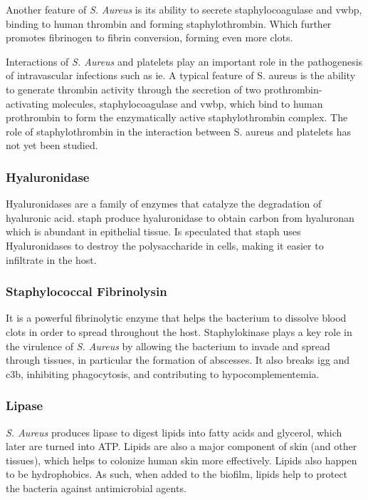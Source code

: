 Another feature of \textit{S. Aureus} is its ability to secrete staphylocoagulase and \gls{vwbp}, binding to human thrombin and forming staphylothrombin. Which further promotes fibrinogen to fibrin conversion, forming even more clots.

Interactions of \textit{S. Aureus} and platelets play an important role in the pathogenesis of intravascular infections such as \gls{ie}. A typical feature of S. aureus is the ability to generate thrombin activity through the secretion of two prothrombin-activating molecules, staphylocoagulase and \gls{vwbp}, which bind to human prothrombin to form the enzymatically active staphylothrombin complex. The role of staphylothrombin in the interaction between S. aureus and platelets has not yet been studied. \cite{Vanassche2012}

\subsubsection{Hyaluronidase}

Hyaluronidases are a family of enzymes that catalyze the degradation of hyaluronic acid. \gls{staph} produce hyaluronidase to obtain carbon from hyaluronan which is abundant in epithelial tissue. Is speculated that \gls{staph} uses Hyaluronidases to destroy the polysaccharide in cells, making it easier to infiltrate in the host.

\subsubsection{Staphylococcal Fibrinolysin}

It is a powerful fibrinolytic enzyme that helps the bacterium to dissolve blood clots in order to spread throughout the host. Staphylokinase plays a key role in the virulence of \textit{S. Aureus} by allowing the bacterium to invade and spread through tissues, in particular the formation of abscesses. It also breaks \gls{igg} and \gls{c3b}, inhibiting phagocytosis, and contributing to hypocomplementemia.

\subsubsection{Lipase}

\textit{S. Aureus} produces lipase to digest lipids into fatty acids and glycerol, which later are turned into ATP. Lipids are also a major component of skin (and other tissues), which helps to colonize human skin more effectively. Lipids also happen to be hydrophobics. As such, when added to the biofilm, lipids help to protect the bacteria against antimicrobial agents.

